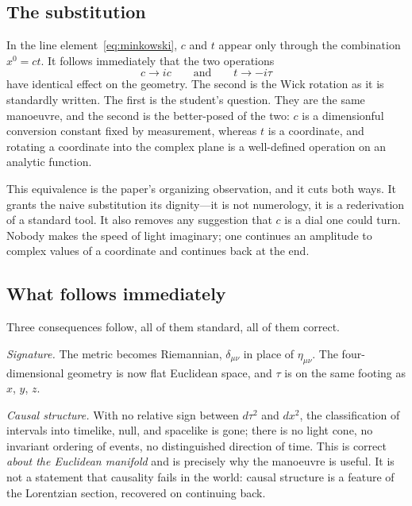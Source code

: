 \documentclass[twocolumn,floatfix,aps,prd,nofootinbib]{revtex4-2}
\begin{document}
\subsection{The substitution}

In the line element~\eqref{eq:minkowski}, $c$ and $t$ appear only through the combination $x^0=ct$. It follows immediately that the two operations
\begin{equation}
c\to ic \qquad\text{and}\qquad t\to-i\tau
\label{eq:equivalence}
\end{equation}
have identical effect on the geometry. The second is the Wick rotation as it is standardly written. The first is the student's question. They are the same manoeuvre, and the second is the better-posed of the two: $c$ is a dimensionful conversion constant fixed by measurement, whereas $t$ is a coordinate, and rotating a coordinate into the complex plane is a well-defined operation on an analytic function.

This equivalence is the paper's organizing observation, and it cuts both ways. It grants the naive substitution its dignity---it is not numerology, it is a rederivation of a standard tool. It also removes any suggestion that $c$ is a dial one could turn. Nobody makes the speed of light imaginary; one continues an amplitude to complex values of a coordinate and continues back at the end.

\subsection{What follows immediately}

Three consequences follow, all of them standard, all of them correct.

\emph{Signature.} The metric becomes Riemannian, $\delta_{\mu\nu}$ in place of $\eta_{\mu\nu}$. The four-dimensional geometry is now flat Euclidean space, and $\tau$ is on the same footing as $x$, $y$, $z$.

\emph{Causal structure.} With no relative sign between $d\tau^2$ and $dx^2$, the classification of intervals into timelike, null, and spacelike is gone; there is no light cone, no invariant ordering of events, no distinguished direction of time. This is correct \emph{about the Euclidean manifold} and is precisely why the manoeuvre is useful. It is not a statement that causality fails in the world: causal structure is a feature of the Lorentzian section, recovered on continuing back.
\end{document}
